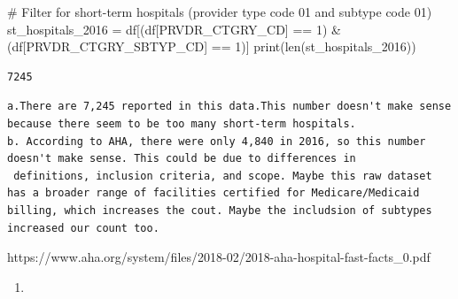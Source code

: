 \documentclass[
  letterpaper,
  DIV=11,
  numbers=noendperiod]{scrartcl}
\newenvironment{Shaded}{\begin{snugshade}}{\end{snugshade}}
\newcommand{\BuiltInTok}[1]{\textcolor[rgb]{0.00,0.23,0.31}{#1}}
\newcommand{\CommentTok}[1]{\textcolor[rgb]{0.37,0.37,0.37}{#1}}
\newcommand{\DecValTok}[1]{\textcolor[rgb]{0.68,0.00,0.00}{#1}}
\newcommand{\NormalTok}[1]{\textcolor[rgb]{0.00,0.23,0.31}{#1}}
\newcommand{\OperatorTok}[1]{\textcolor[rgb]{0.37,0.37,0.37}{#1}}
\newcommand{\StringTok}[1]{\textcolor[rgb]{0.13,0.47,0.30}{#1}}
\providecommand{\tightlist}{%
  \setlength{\itemsep}{0pt}\setlength{\parskip}{0pt}}\usepackage{longtable,booktabs,array}
\begin{document}
\begin{Shaded}
\begin{Highlighting}[]
\CommentTok{\# Filter for short{-}term hospitals (provider type code 01 and subtype code 01)}
\NormalTok{st\_hospitals\_2016 }\OperatorTok{=}\NormalTok{ df[(df[}\StringTok{\textquotesingle{}PRVDR\_CTGRY\_CD\textquotesingle{}}\NormalTok{] }\OperatorTok{==} \DecValTok{1}\NormalTok{) }\OperatorTok{\&}
\NormalTok{                       (df[}\StringTok{\textquotesingle{}PRVDR\_CTGRY\_SBTYP\_CD\textquotesingle{}}\NormalTok{] }\OperatorTok{==} \DecValTok{1}\NormalTok{)]}
\BuiltInTok{print}\NormalTok{(}\BuiltInTok{len}\NormalTok{(st\_hospitals\_2016))}
\end{Highlighting}
\end{Shaded}

\begin{verbatim}
7245
\end{verbatim}

\begin{verbatim}
a.There are 7,245 reported in this data.This number doesn't make sense because there seem to be too many short-term hospitals.
b. According to AHA, there were only 4,840 in 2016, so this number doesn't make sense. This could be due to differences in
 definitions, inclusion criteria, and scope. Maybe this raw dataset  has a broader range of facilities certified for Medicare/Medicaid billing, which increases the cout. Maybe the includsion of subtypes increased our count too.
\end{verbatim}

https://www.aha.org/system/files/2018-02/2018-aha-hospital-fast-facts\_0.pdf

\begin{enumerate}
\def\labelenumi{\arabic{enumi}.}
\setcounter{enumi}{2}
\tightlist
\item
\end{enumerate}
\end{document}
